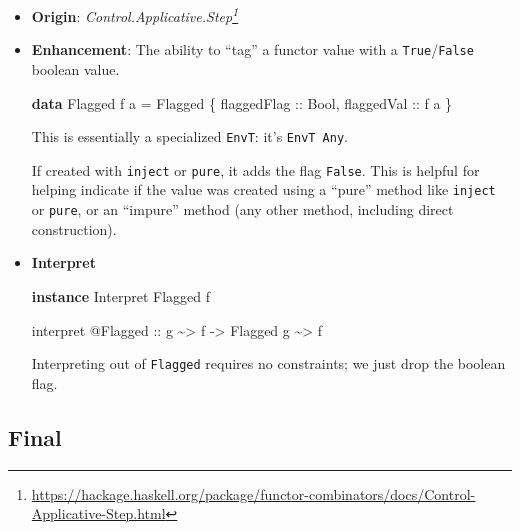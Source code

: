 \documentclass[]{article}
\newenvironment{Shaded}{}{}
\newcommand{\DataTypeTok}[1]{\textcolor[rgb]{0.56,0.13,0.00}{#1}}
\newcommand{\KeywordTok}[1]{\textcolor[rgb]{0.00,0.44,0.13}{\textbf{#1}}}
\newcommand{\NormalTok}[1]{#1}
\newcommand{\OperatorTok}[1]{\textcolor[rgb]{0.40,0.40,0.40}{#1}}
\newcommand{\OtherTok}[1]{\textcolor[rgb]{0.00,0.44,0.13}{#1}}
\renewcommand{\href}[2]{#2\footnote{\url{#1}}}
\begin{document}
\begin{itemize}
\item
  \textbf{Origin}:
  \emph{\href{https://hackage.haskell.org/package/functor-combinators/docs/Control-Applicative-Step.html}{Control.Applicative.Step}}
\item
  \textbf{Enhancement}: The ability to ``tag'' a functor value with a
  \texttt{True}/\texttt{False} boolean value.

\begin{Shaded}
\begin{Highlighting}[]
\KeywordTok{data} \DataTypeTok{Flagged}\NormalTok{ f a }\OtherTok{=} \DataTypeTok{Flagged}\NormalTok{ \{}\OtherTok{ flaggedFlag ::} \DataTypeTok{Bool}\NormalTok{,}\OtherTok{ flaggedVal ::}\NormalTok{ f a \}}
\end{Highlighting}
\end{Shaded}

  This is essentially a specialized \texttt{EnvT}: it's \texttt{EnvT\ Any}.

  If created with \texttt{inject} or \texttt{pure}, it adds the flag
  \texttt{False}. This is helpful for helping indicate if the value was created
  using a ``pure'' method like \texttt{inject} or \texttt{pure}, or an
  ``impure'' method (any other method, including direct construction).
\item
  \textbf{Interpret}

\begin{Shaded}
\begin{Highlighting}[]
\KeywordTok{instance} \DataTypeTok{Interpret} \DataTypeTok{Flagged}\NormalTok{ f}

\NormalTok{interpret }\OperatorTok{@}\DataTypeTok{Flagged}
\OtherTok{    ::}\NormalTok{ g }\OperatorTok{\textasciitilde{}\textgreater{}}\NormalTok{ f}
    \OtherTok{{-}\textgreater{}} \DataTypeTok{Flagged}\NormalTok{ g }\OperatorTok{\textasciitilde{}\textgreater{}}\NormalTok{ f}
\end{Highlighting}
\end{Shaded}

  Interpreting out of \texttt{Flagged} requires no constraints; we just drop the
  boolean flag.
\end{itemize}

\subsection{Final}\label{final}
\end{document}
